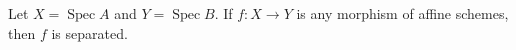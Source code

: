 Let $X = \operatorname{Spec} A$ and $Y = \operatorname{Spec} B$. If $f: X \to Y$ is any morphism of affine schemes, then $f$ is separated.
